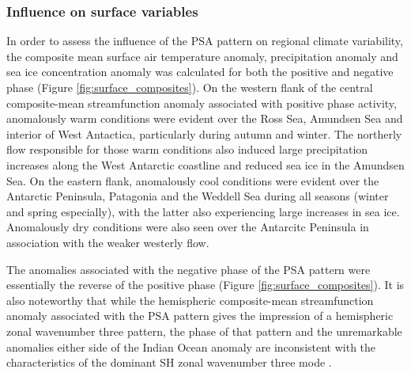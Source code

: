 \subsubsection{Influence on surface variables} 

In order to assess the influence of the PSA pattern on regional climate variability, the composite mean surface air temperature anomaly, precipitation anomaly and sea ice concentration anomaly was calculated for both the positive and negative phase (Figure \ref{fig:surface_composites}). On the western flank of the central composite-mean streamfunction anomaly associated with positive phase activity, anomalously warm conditions were evident over the Ross Sea, Amundsen Sea and interior of West Antactica, particularly during autumn and winter. The northerly flow responsible for those warm conditions also induced large precipitation increases along the West Antarctic coastline and reduced sea ice in the Amundsen Sea. On the eastern flank, anomalously cool conditions were evident over the Antarctic Peninsula, Patagonia and the Weddell Sea during all seasons (winter and spring especially), with the latter also experiencing large increases in sea ice. Anomalously dry conditions were also seen over the Antarcitc Peninsula in association with the weaker westerly flow. 

The anomalies associated with the negative phase of the PSA pattern were essentially the reverse of the positive phase (Figure \ref{fig:surface_composites}). It is also noteworthy that while the hemispheric composite-mean streamfunction anomaly associated with the PSA pattern gives the impression of a hemispheric zonal wavenumber three pattern, the phase of that pattern and the unremarkable anomalies either side of the Indian Ocean anomaly are inconsistent with the characteristics of the dominant SH zonal wavenumber three mode \citep[e.g.][]{Raphael2004,IrvingSimmonds2015}.


